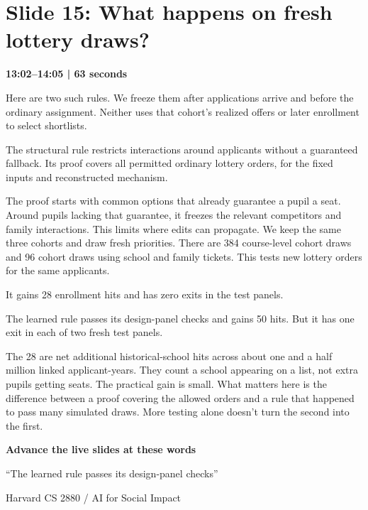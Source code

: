 \documentclass[11pt]{article}
\begin{document}
\section*{Slide 15: What happens on fresh lottery draws?}
{\color{navy}\textbf{13:02--14:05 | 63 seconds}}\par\medskip
Here are two such rules. We freeze them after applications arrive and before the ordinary assignment. Neither uses that cohort's realized offers or later enrollment to select shortlists.
\par
The structural rule restricts interactions around applicants without a guaranteed fallback. Its proof covers all permitted ordinary lottery orders, for the fixed inputs and reconstructed mechanism.
\par
The proof starts with common options that already guarantee a pupil a seat. Around pupils lacking that guarantee, it freezes the relevant competitors and family interactions. This limits where edits can propagate. We keep the same three cohorts and draw fresh priorities. There are 384 course-level cohort draws and 96 cohort draws using school and family tickets. This tests new lottery orders for the same applicants.
\par
It gains 28 enrollment hits and has zero exits in the test panels.
\par
The learned rule passes its design-panel checks and gains 50 hits. But it has one exit in each of two fresh test panels.
\par
The 28 are net additional historical-school hits across about one and a half million linked applicant-years. They count a school appearing on a list, not extra pupils getting seats. The practical gain is small. What matters here is the difference between a proof covering the allowed orders and a rule that happened to pass many simulated draws. More testing alone doesn't turn the second into the first.
\par
\vfill{\small\textbf{Advance the live slides at these words}\par}
{\small ``The learned rule passes its design-panel checks''}\par
\newpage
{\small Harvard CS 2880 / AI for Social Impact}\par
\end{document}
